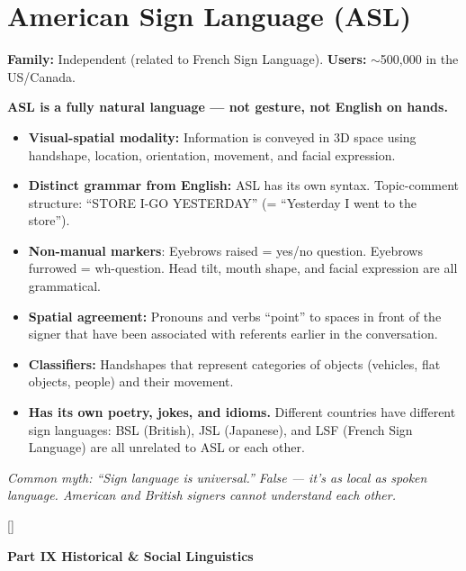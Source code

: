 \documentclass[11pt, letterpaper]{article}
\newcommand{\bluesections}{%
  \titleformat{\section}{\large\bfseries\color{sectionblue}}{}{0em}{}[\color{sectionblue}\titlerule]%
  \titleformat{\subsection}{\normalsize\bfseries\color{sectionblue!80!black}}{}{0em}{}%
}
\newcommand{\partbanner}[3]{%
  \begin{tcolorbox}[colback=#1, colframe=#2, boxrule=1.2pt, arc=4pt,
    left=8pt, right=8pt, top=6pt, bottom=6pt]
    \begin{center}{\LARGE\bfseries #3}\end{center}
  \end{tcolorbox}%
}
\begin{document}
\section*{American Sign Language (ASL)}

\textbf{Family:} Independent (related to French Sign Language). \textbf{Users:} $\sim$500{,}000 in the US/Canada.

\textbf{ASL is a fully natural language --- not gesture, not English on hands.}

\begin{itemize}[noitemsep]
  \item \textbf{Visual-spatial modality:} Information is conveyed in 3D space using handshape, location, orientation, movement, and facial expression.
  \item \textbf{Distinct grammar from English:} ASL has its own syntax. Topic-comment structure: ``STORE I-GO YESTERDAY'' (= ``Yesterday I went to the store'').
  \item \textbf{Non-manual markers}: Eyebrows raised = yes/no question. Eyebrows furrowed = wh-question. Head tilt, mouth shape, and facial expression are all grammatical.
  \item \textbf{Spatial agreement:} Pronouns and verbs ``point'' to spaces in front of the signer that have been associated with referents earlier in the conversation.
  \item \textbf{Classifiers:} Handshapes that represent categories of objects (vehicles, flat objects, people) and their movement.
  \item \textbf{Has its own poetry, jokes, and idioms.} Different countries have different sign languages: BSL (British), JSL (Japanese), and LSF (French Sign Language) are all unrelated to ASL or each other.
\end{itemize}

\textit{Common myth: ``Sign language is universal.'' False --- it's as local as spoken language. American and British signers cannot understand each other.}

\newpage

\bluesections
{}
\partbanner{partbg}{sectionblue}{Part IX \quad Historical \& Social Linguistics}
\end{document}
